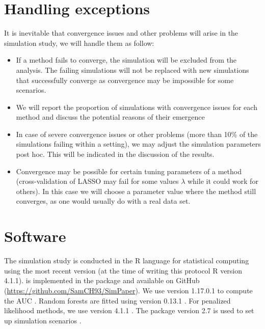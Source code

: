 \documentclass[a4paper, 11pt]{article}\usepackage[]{graphicx}\usepackage[]{color}
\begin{document}
\section{Handling exceptions} \label{sec:exceptions}
It is inevitable that convergence issues and other problems will arise
in the simulation study, we will handle them as follow:
\begin{itemize}
  \item If a method fails to converge, the simulation will be excluded from the
  analysis. The failing simulations will not be replaced with new simulations that
  successfully converge as convergence may be impossible for some scenarios.
  \item We will report the proportion of simulations with convergence issues
  for each method and discuss the potential reasons of their emergence
  \item In case of severe convergence issues or other problems (more than 10\% of the
  simulations failing within a setting), we may adjust
  the simulation parameters post hoc. This will be indicated in the discussion of
  the results.
  \item Convergence may be possible for certain tuning parameters of a method
  (\eg cross-validation of LASSO may fail for some values $\lambda$ while it could
  work for others). In this case we will choose a parameter value where the method
  still converges, as one would usually do with a real data set.

\end{itemize}


\section{Software} \label{sec:software}

The simulation study is conducted in the \textsf{R} language for statistical
computing \citep{pkg:base} using the most recent version (at the time of writing
this protocol %
R version 4.1.1).
\ainet{} is implemented in the  package and available on GitHub 
(\url{https://github.com/SamCH93/SimPaper}).
We use  version 1.17.0.1 to compute the AUC \citep{pkg:proc}.
Random forests are fitted using  version 0.13.1 \citep{ranger2017}.
For penalized likelihood methods, we use  version 4.1.1
\citep{Friedman2010,Simon2011}.
The  package version 2.7 is used to set up simulation scenarios
\citep{Chalmers2020}.
\end{document}
